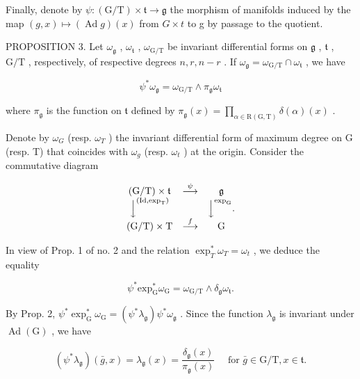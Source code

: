 Finally, denote by \(\psi:(\mathrm{G}/\mathrm{T})\times\mathfrak{t}\to\mathfrak{g}\) the morphism of manifolds induced by the map \((g,x)\mapsto(\operatorname{Ad}g)(x)\) from \(G\times t\) to g by passage to the quotient.

PROPOSITION 3. Let \(\omega_{\mathfrak{g}}\) , \(\omega_{\mathfrak{t}}\) , \(\omega_{\mathrm{G / T}}\) be invariant differential forms on \(\mathfrak{g}\) , \(\mathfrak{t}\) , \(\mathrm{G / T}\) , respectively, of respective degrees \(n, r, n - r\) . If \(\omega_{\mathfrak{g}} = \omega_{\mathrm{G / T}} \cap \omega_{\mathfrak{t}}\) , we have

\[
\psi^ {*} \omega_ {\mathfrak {g}} = \omega_ {\mathrm{G/T}} \wedge \pi_ {\mathfrak {g}} \omega_ {\mathfrak {t}}
\]

where \(\pi_{\mathfrak{g}}\) is the function on \(\mathfrak{t}\) defined by \(\pi_{\mathfrak{g}}(x) = \prod_{\alpha \in \mathrm{R}(\mathrm{G},\mathrm{T})}\delta (\alpha)(x)\) .

Denote by \(\omega_{G}\) (resp. \(\omega_{T}\) ) the invariant differential form of maximum degree on G (resp. T) that coincides with \(\omega_{g}\) (resp. \(\omega_{t}\) ) at the origin. Consider the commutative diagram

\[
\begin{array}{c c c} (\mathrm{G} / \mathrm{T}) \times \mathfrak {t} & \stackrel {{\psi}} {{\longrightarrow}} & \mathfrak {g} \\ \Big \downarrow^ {(\mathrm{Id}, \exp_ {\mathrm{T}})} & & \Big \downarrow^ {\exp_ {\mathrm{G}}} . \\ (\mathrm{G} / \mathrm{T}) \times \mathrm{T} & \stackrel {{f}} {{\longrightarrow}} & \mathrm{G} \end{array}
\]

In view of Prop. 1 of no. 2 and the relation \(\exp_{T}^{*}\omega_{T} = \omega_{t}\) , we deduce the equality

\[
\psi^ {*} \mathrm{exp} _ {\mathrm{G}} ^ {*} \omega_ {\mathrm{G}} = \omega_ {\mathrm{G/T}} \wedge \delta_ {\mathfrak {g}} \omega_ {\mathfrak {t}}.
\]

By Prop. 2, \(\psi^{*}\exp_{\mathrm{G}}^{*}\omega_{\mathrm{G}} = (\psi^{*}\lambda_{\mathfrak{g}})\psi^{*}\omega_{\mathfrak{g}}\) . Since the function \(\lambda_{\mathfrak{g}}\) is invariant under \(\operatorname{Ad}(\mathrm{G})\) , we have

\[
(\psi^ {*} \lambda_ {\mathfrak {g}}) (\bar {g}, x) = \lambda_ {\mathfrak {g}} (x) = \frac {\delta_ {\mathfrak {g}} (x)}{\pi_ {\mathfrak {g}} (x)} \quad \text { for } \bar {g} \in \mathrm{G/T}, x \in \mathfrak {t}.
\]

